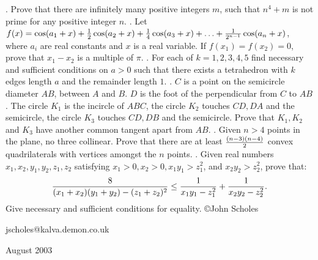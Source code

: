 \nopagenumbers
{}
\vskip 25pt
. Prove that there are infinitely many positive integers $m$, such that $n^4+m$ is not prime for any positive integer $n$.
\vskip 12pt
. Let $f(x)=\cos(a_1+x)+{1\over2}\cos(a_2+x)+{1\over4}\cos(a_3+x)+\ldots+{1\over2^{n-1}}\cos(a_n+x)$, where $a_i$ are real constants and $x$ is a real variable. If $f(x_1)=f(x_2)=0$, prove that $x_1-x_2$ is a multiple of $\pi$.
\vskip 12pt
. For each of $k=1,2,3,4,5$ find necessary and sufficient conditions on $a>0$ such that there exists a tetrahedron with $k$ edges length $a$ and the remainder length $1$.
\vskip 12pt
. $C$ is a point on the semicircle diameter $AB$, between $A$ and $B$. $D$ is the foot of the perpendicular from $C$ to $AB$. The circle $K_1$ is the incircle of $ABC$, the circle $K_2$ touches $CD,DA$ and the semicircle, the circle $K_3$ touches $CD,DB$ and the semicircle. Prove that $K_1,K_2$ and $K_3$ have another common tangent apart from $AB$.
\vskip 12pt
. Given $n>4$ points in the plane, no three collinear. Prove that there are at least $(n-3)(n-4)\over2$ convex quadrilaterals with vertices amongst the $n$ points.
\vskip 12pt
. Given real numbers $x_1,x_2,y_1,y_2,z_1,z_2$ satisfying $x_1>0,x_2>0,x_1y_1>z_1^2$, and $x_2y_2>z_2^2$, prove that: $${8\over(x_1+x_2)(y_1+y_2)-(z_1+z_2)^2}\le{1\over x_1y_1-z_1^2}+{1\over x_2y_2-z_2^2}.$$ Give necessary and sufficient conditions for equality.
\vskip 20pt
\noindent \copyright John Scholes

\noindent jscholes@kalva.demon.co.uk

 August 2003

\bye
